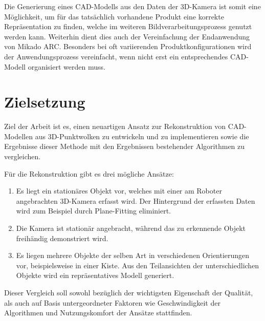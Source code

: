 Die Generierung eines CAD-Modells aus den Daten der 3D-Kamera ist somit eine Möglichkeit, um für das tatsächlich vorhandene Produkt eine korrekte Repräsentation zu finden, welche im weiteren Bildverarbeitungsprozess genutzt werden kann.
Weiterhin dient dies auch der Vereinfachung der Endanwendung von Mikado ARC.
Besonders bei oft variierenden Produktkonfigurationen wird der Anwendungsprozess vereinfacht, wenn nicht erst ein entsprechendes CAD-Modell organisiert werden muss.


\section{Zielsetzung}

Ziel der Arbeit ist es, einen neuartigen Ansatz zur Rekonstruktion von CAD-Modellen aus 3D-Punktwolken zu entwickeln und zu implementieren sowie die Ergebnisse dieser Methode mit den Ergebnissen bestehender Algorithmen zu vergleichen.

Für die Rekonstruktion gibt es drei mögliche Ansätze:

\begin{enumerate}
\item Es liegt ein stationäres Objekt vor, welches mit einer am Roboter angebrachten 3D-Kamera erfasst wird.
Der Hintergrund der erfassten Daten wird zum Beispiel durch Plane-Fitting \cite{schomaker1959fit} eliminiert.

\item Die Kamera ist stationär angebracht, während das zu erkennende Objekt freihändig demonstriert wird.

\item Es liegen mehrere Objekte der selben Art in verschiedenen Orientierungen vor, beispielsweise in einer Kiste.
Aus den Teilansichten der unterschiedlichen Objekte wird ein repräsentatives Modell generiert.
\end{enumerate}

Dieser Vergleich soll sowohl bezüglich der wichtigsten Eigenschaft der Qualität, als auch auf Basis untergeordneter Faktoren wie Geschwindigkeit der Algorithmen und Nutzungskomfort der Ansätze stattfinden.

